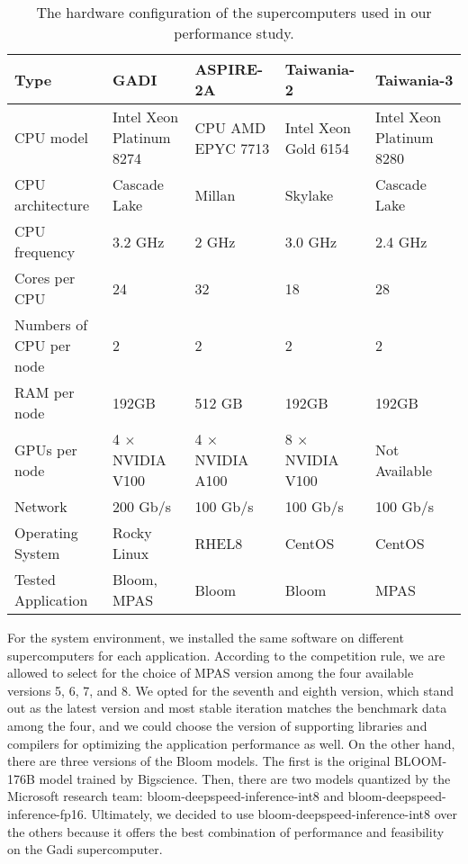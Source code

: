 \begin{table*}[t]
    \centering
    \caption{The hardware configuration of the supercomputers used in our performance study.}
    \begin{tabular}{l|llll}
        \toprule
        Type & GADI & ASPIRE-2A  & Taiwania-2 & Taiwania-3\\
        \midrule
        CPU model & Intel Xeon Platinum 8274 & CPU AMD EPYC 7713  & Intel Xeon Gold 6154 & Intel Xeon Platinum 8280\\
        CPU architecture & Cascade Lake & Millan & Skylake &  Cascade Lake \\
        CPU frequency & 3.2 GHz & 2 GHz & 3.0 GHz & 2.4 GHz\\
        Cores per CPU & 24 & 32 & 18 & 28\\
        Numbers of CPU per node & 2 & 2 & 2 & 2\\
        RAM per node & 192GB & 512 GB & 192GB &  192GB   \\
        GPUs per node &  4 $\times$ NVIDIA V100 & 4 $\times$ NVIDIA A100 & 8 $\times$ NVIDIA V100 & Not Available  \\
        Network    & 200 Gb/s & 100 Gb/s & 100 Gb/s  & 100 Gb/s\\
        \midrule
        Operating System & Rocky Linux & RHEL8 & CentOS & CentOS \\
        Tested Application & Bloom, MPAS & Bloom & Bloom & MPAS \\
        \bottomrule
    \end{tabular}
    \label{table:hardware}
\end{table*}



For the system environment, we installed the same software on different supercomputers for each application. According to the competition rule, we are allowed to select for the choice of MPAS version among the four available versions 5, 6, 7, and 8. We opted for the seventh and eighth version, which stand out as the latest version and most stable iteration matches the benchmark data among the four, and we could choose the version of supporting libraries and compilers for optimizing the application performance as well. On the other hand, there are three versions of the Bloom models. The first is the original BLOOM-176B model trained by Bigscience. Then, there are two models quantized by the Microsoft research team: bloom-deepspeed-inference-int8 and bloom-deepspeed-inference-fp16. Ultimately, we decided to use bloom-deepspeed-inference-int8 over the others because it offers the best combination of performance and feasibility on the Gadi supercomputer.


